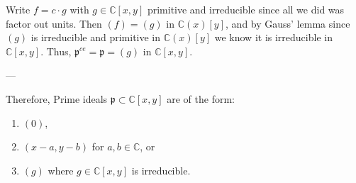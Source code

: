 \documentclass[12pt, letterpaper]{article}
\newcommand{\C}{\mathbb{C}}
\newcommand{\p}{\mathfrak{p}}
\begin{document}
\begin{problemproof}
Write $f = c \cdot g$ with $g \in \mathbb{C}[x,y]$ primitive and irreducible since all we did was factor out units.  
Then $(f) = (g)$ in $\mathbb{C}(x)[y]$, and by Gauss' lemma since $(g)$ is irreducible and primitive in $\C(x)[y]$ we know it is irreducible in $\C[x,y]$. Thus, $\mathfrak{p}^{ce}=\p = (g)$ in $\mathbb{C}[x,y]$.

---

Therefore, Prime ideals $\mathfrak{p} \subset \mathbb{C}[x,y]$ are of the form:

\begin{enumerate}
    \item $(0)$,  
    \item $(x-a, y-b)$ for $a,b \in \mathbb{C}$, or  
    \item $(g)$ where $g \in \mathbb{C}[x,y]$ is irreducible.  
\end{enumerate}

\end{problemproof}
    
\end{document}
